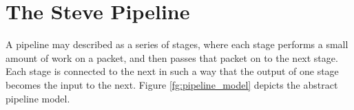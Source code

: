 %
%
%
%

\section{The Steve Pipeline} \label{pipeline_desc}


A pipeline may described as a series of stages, where each stage performs
a small amount of work on a packet, and then passes that packet on to the
next stage.
Each stage is connected to the next in such a way that the output of
one stage becomes the input to the next. 
Figure \ref{fg:pipeline_model} depicts the abstract pipeline model.

